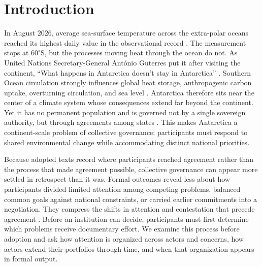 \documentclass{fun_article}
\begin{document}
\section{Introduction}
In August 2026, average sea-surface temperature across the extra-polar oceans reached its highest daily value in the observational record \cite{Poynting2026OceanRecord}.  The measurement stops at $60^\circ$S, but the processes moving heat through the ocean do not. As United Nations Secretary-General Ant\'onio Guterres put it after visiting the continent, ``What happens in Antarctica doesn't stay in Antarctica'' \cite{Guterres2023Antarctica}. Southern Ocean circulation strongly influences global heat storage, anthropogenic carbon uptake, overturning circulation, and sea level \cite{IPCC2021OceanCryosphere,Holland2020}. Antarctica therefore sits near the center of a climate system whose consequences extend far beyond the continent. Yet it has no permanent population and is governed not by a single sovereign authority, but through agreements among states \cite{AntarcticTreaty1959,Joyner1998}. This makes Antarctica a continent-scale problem of collective governance: participants must respond to shared environmental change while accommodating distinct national priorities.

Because adopted texts record where participants reached agreement rather than the process that made agreement possible, collective governance can appear more settled in retrospect than it was. Formal outcomes reveal less about how participants divided limited attention among competing problems, balanced common goals against national constraints, or carried earlier commitments into a negotiation. They compress the shifts in attention and contestation that precede agreement \cite{BachrachBaratz1962,Stone2013,Drubel2023HiddenContestation}. Before an institution can decide, participants must first determine which problems receive documentary effort. We examine this process before adoption and ask how attention is organized across actors and concerns, how actors extend their portfolios through time, and when that organization appears in formal output.
\end{document}
